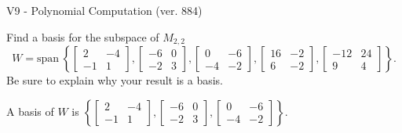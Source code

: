 \begin{exercise}
  \begin{exerciseTitle}V9 - Polynomial Computation (ver. 884)\end{exerciseTitle}
  \begin{exerciseStatement}
    Find a basis for the subspace of \(M_{2,2}\) 
\[W=\mathrm{span}\ \left\{\left[\begin{array}{cc}
2 & -4 \\
-1 & 1
\end{array}\right] , \left[\begin{array}{cc}
-6 & 0 \\
-2 & 3
\end{array}\right] , \left[\begin{array}{cc}
0 & -6 \\
-4 & -2
\end{array}\right] , \left[\begin{array}{cc}
16 & -2 \\
6 & -2
\end{array}\right] , \left[\begin{array}{cc}
-12 & 24 \\
9 & 4
\end{array}\right]\right\}.\]
 Be sure to explain why your result is a basis.


  \end{exerciseStatement}
  \begin{exerciseAnswer}
   A basis of \(W\) is  \(\left\{\left[\begin{array}{cc}
2 & -4 \\
-1 & 1
\end{array}\right] , \left[\begin{array}{cc}
-6 & 0 \\
-2 & 3
\end{array}\right] , \left[\begin{array}{cc}
0 & -6 \\
-4 & -2
\end{array}\right]\right\}\).
  


  \end{exerciseAnswer}
\end{exercise}